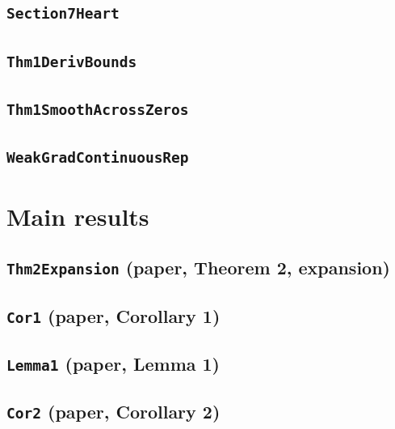 \documentclass[11pt]{amsart}
\theoremstyle{definition}
\begin{document}
\subsection{\texorpdfstring{\texttt{Section7Heart}}{Section7Heart}}\label{node:Section7Heart}


\subsection{\texorpdfstring{\texttt{Thm1DerivBounds}}{Thm1DerivBounds}}\label{node:Thm1DerivBounds}


\subsection{\texorpdfstring{\texttt{Thm1SmoothAcrossZeros}}{Thm1SmoothAcrossZeros}}\label{node:Thm1SmoothAcrossZeros}


\subsection{\texorpdfstring{\texttt{WeakGradContinuousRep}}{WeakGradContinuousRep}}\label{node:WeakGradContinuousRep}


\section{Main results}\label{sec:main}
\subsection{\texorpdfstring{\texttt{Thm2Expansion} (paper, Theorem 2, expansion)}{Thm2Expansion}}\label{node:Thm2Expansion}


\subsection{\texorpdfstring{\texttt{Cor1} (paper, Corollary 1)}{Cor1}}\label{node:Cor1}


\subsection{\texorpdfstring{\texttt{Lemma1} (paper, Lemma 1)}{Lemma1}}\label{node:Lemma1}


\subsection{\texorpdfstring{\texttt{Cor2} (paper, Corollary 2)}{Cor2}}\label{node:Cor2}

\end{document}
